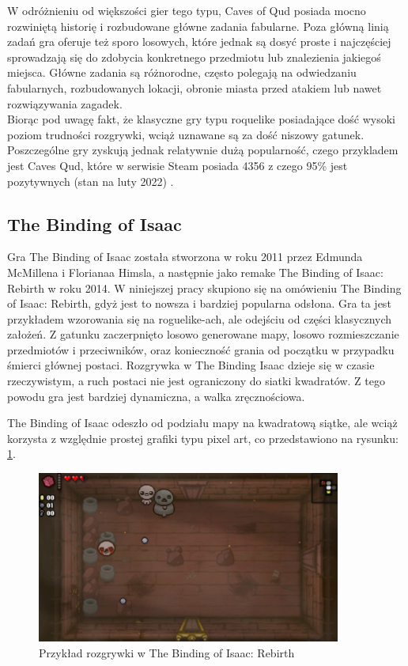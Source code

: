 \documentclass[12pt,twoside]{article}
\begin{document}
W odróżnieniu od większości gier tego typu, Caves of Qud posiada mocno rozwiniętą historię i rozbudowane główne zadania fabularne. Poza główną linią zadań gra oferuje też sporo losowych, które jednak są dosyć proste i najczęściej sprowadzają się do zdobycia konkretnego przedmiotu lub znalezienia jakiegoś miejsca. Główne zadania są różnorodne, często polegają na odwiedzaniu fabularnych, rozbudowanych lokacji, obronie miasta przed atakiem lub nawet rozwiązywania zagadek.\\

Biorąc pod uwagę fakt, że klasyczne gry typu roquelike posiadające dość wysoki poziom trudności rozgrywki, wciąż uznawane są za dość niszowy gatunek. Poszczególne gry zyskują jednak relatywnie dużą popularność, czego przykladem jest Caves Qud, które w serwisie Steam posiada 4356 z czego 95\% jest pozytywnych (stan na luty 2022) \cite{coq_steam}.



\subsection{The Binding of Isaac}

Gra The Binding of Isaac została stworzona w roku 2011 przez Edmunda McMillena i Florianaa Himsla, a następnie jako remake The Binding of Isaac: Rebirth w roku 2014. W niniejszej pracy skupiono się na omówieniu The Binding of Isaac: Rebirth, gdyż jest to nowsza i bardziej popularna odsłona. Gra ta jest przykładem wzorowania się na roguelike-ach, ale odejściu od części klasycznych założeń. Z gatunku zaczerpnięto losowo generowane mapy, losowo rozmieszczanie przedmiotów i przeciwników, oraz konieczność grania od początku w przypadku śmierci głównej postaci. Rozgrywka w The Binding Isaac dzieje się w czasie rzeczywistym, a ruch postaci nie jest ograniczony do siatki kwadratów. Z tego powodu gra jest bardziej dynamiczna, a walka zręcznościowa.

The Binding of Isaac odeszło od podziału mapy na kwadratową siątke, ale wciąż korzysta z względnie prostej grafiki typu pixel art, co przedstawiono na rysunku: \ref{tboi:scr1}.

\FloatBarrier
\begin{figure}[h]
	\centering
	\includegraphics[width=10cm]{images/tboi/scr1.png}
	\caption{Przykład rozgrywki w The Binding of Isaac: Rebirth}
	\label{tboi:scr1}
\end{figure}
\FloatBarrier
\end{document}
